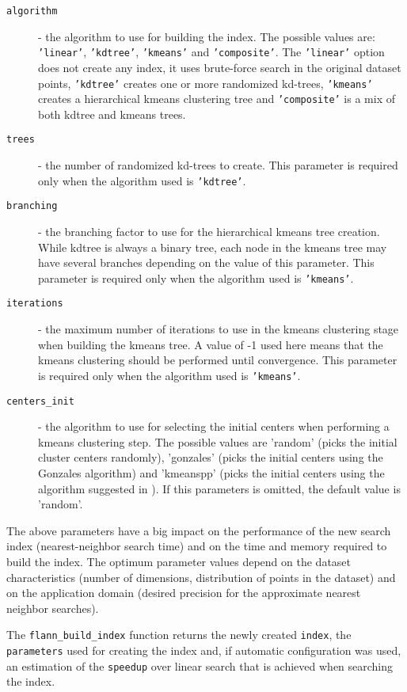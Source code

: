 \documentclass[letter,10pt]{article}
\begin{document}
\begin{description}
\item[\texttt{algorithm}] - the algorithm to use for building the index.
The possible values are: \texttt{'linear'}, \texttt{'kdtree'},
\texttt{'kmeans'} and \texttt{'composite'}. The \texttt{'linear'} option
does not create any index, it uses brute-force search in the original
dataset points, \texttt{'kdtree'} creates one or more randomized kd-trees,
\texttt{'kmeans'} creates a hierarchical kmeans clustering tree and
\texttt{'composite'} is a mix of both kdtree and kmeans trees.
\item[\texttt{trees}] - the number of randomized kd-trees to
create. This parameter is required only when the algorithm used is
\texttt{'kdtree'}.
\item[\texttt{branching}] - the branching factor to use for
the hierarchical kmeans tree creation. While kdtree is always a binary
tree, each node in the kmeans tree may have several branches depending on
the value of this parameter. This parameter is required only when the
algorithm used is \texttt{'kmeans'}.
\item[\texttt{iterations}] - the maximum number of iterations to
use in the kmeans clustering stage when building the kmeans tree. A value
of -1 used here means that the kmeans clustering should be performed until
convergence. This parameter is required only when the algorithm used is
\texttt{'kmeans'}.
\item[\texttt{centers\_init}] - the algorithm to use for selecting the initial
centers when performing a kmeans clustering step. The possible values are
'random' (picks the initial cluster centers randomly), 'gonzales' (picks the
initial centers using the Gonzales algorithm) and 'kmeanspp' (picks the initial
centers using the algorithm suggested in \cite{arthur_kmeanspp_2007}). If this
parameters is omitted, the default value is 'random'.

\end{description}

The above parameters have a big impact on the performance of the new search
index (nearest-neighbor search time) and on the time and memory required to
build the index. The optimum parameter values depend on the dataset
characteristics (number of dimensions, distribution of points in the
dataset) and on the application domain (desired precision for the
approximate nearest neighbor searches).




The \texttt{flann\_build\_index} function returns the newly created
\texttt{index}, the \texttt{parameters} used for creating the index and, if
automatic configuration was used, an estimation of the \texttt{speedup}
over linear search that is achieved when searching the index.
\end{document}
